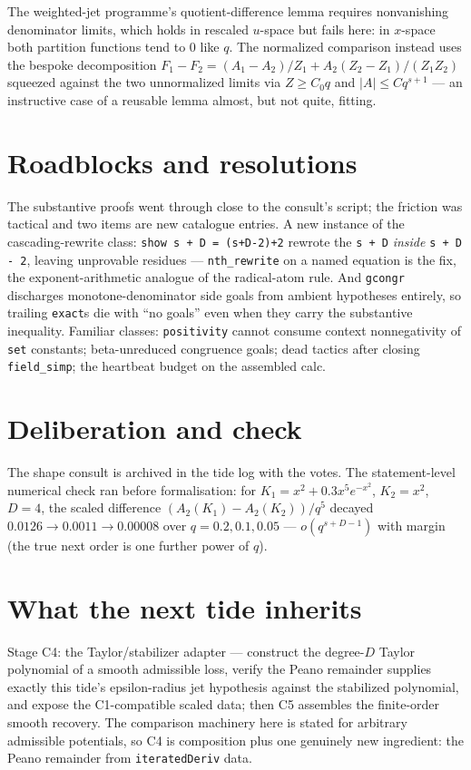 \documentclass[11pt]{article}
\begin{document}
The weighted-jet programme's quotient-difference lemma requires
nonvanishing denominator limits, which holds in rescaled $u$-space
but fails here: in $x$-space both partition functions tend to $0$
like $q$. The normalized comparison instead uses the bespoke
decomposition
$F_1 - F_2 = (A_1 - A_2)/Z_1 + A_2(Z_2 - Z_1)/(Z_1 Z_2)$ squeezed
against the two unnormalized limits via $Z \ge C_0 q$ and
$|A| \le C q^{s+1}$ --- an instructive case of a reusable lemma
almost, but not quite, fitting.

\section{Roadblocks and resolutions}

The substantive proofs went through close to the consult's script;
the friction was tactical and two items are new catalogue entries.
A new instance of the cascading-rewrite class:
\texttt{show s + D = (s+D-2)+2} rewrote the \texttt{s + D}
\emph{inside} \texttt{s + D - 2}, leaving unprovable residues ---
\texttt{nth\_rewrite} on a named equation is the fix, the
exponent-arithmetic analogue of the radical-atom rule. And
\texttt{gcongr} discharges monotone-denominator side goals from
ambient hypotheses entirely, so trailing \texttt{exact}s die with
``no goals'' even when they carry the substantive inequality.
Familiar classes: \texttt{positivity} cannot consume context
nonnegativity of \texttt{set} constants; beta-unreduced congruence
goals; dead tactics after closing \texttt{field\_simp}; the
heartbeat budget on the assembled calc.

\section{Deliberation and check}

The shape consult is archived in the tide log with the votes. The
statement-level numerical check ran before formalisation: for
$K_1 = x^2 + 0.3x^5 e^{-x^2}$, $K_2 = x^2$, $D = 4$, the scaled
difference $(A_2(K_1) - A_2(K_2))/q^5$ decayed
$0.0126 \to 0.0011 \to 0.00008$ over $q = 0.2, 0.1, 0.05$ ---
$o(q^{s+D-1})$ with margin (the true next order is one further power
of $q$).

\section{What the next tide inherits}

Stage C4: the Taylor/stabilizer adapter --- construct the degree-$D$
Taylor polynomial of a smooth admissible loss, verify the Peano
remainder supplies exactly this tide's epsilon-radius jet hypothesis
against the stabilized polynomial, and expose the C1-compatible
scaled data; then C5 assembles the finite-order smooth recovery. The
comparison machinery here is stated for arbitrary admissible
potentials, so C4 is composition plus one genuinely new ingredient:
the Peano remainder from \texttt{iteratedDeriv} data.
\end{document}
